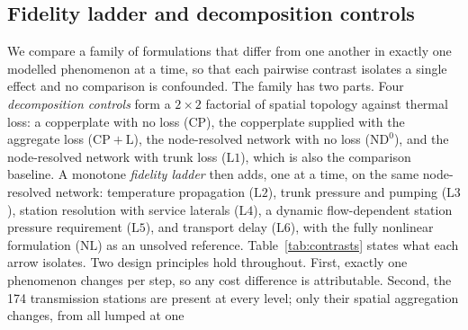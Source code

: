 \documentclass[a4paper,fleqn]{cas-dc}
\newcommand{\CP}{\ensuremath{\mathrm{CP}}}      %
\newcommand{\CPL}{\ensuremath{\mathrm{CP{+}L}}} %
\newcommand{\NDz}{\ensuremath{\mathrm{ND^{0}}}} %
\newcommand{\Lone}{\ensuremath{\mathrm{L1}}}    %
\newcommand{\Ltwo}{\ensuremath{\mathrm{L2}}}    %
\newcommand{\Lthree}{\ensuremath{\mathrm{L3}}}  %
\newcommand{\Lfour}{\ensuremath{\mathrm{L4}}}   %
\newcommand{\Lfive}{\ensuremath{\mathrm{L5}}}   %
\newcommand{\Lsix}{\ensuremath{\mathrm{L6}}}    %
\newcommand{\NLref}{\ensuremath{\mathrm{NL}}}   %
\begin{document}
\subsection{Fidelity ladder and decomposition controls}
We compare a family of formulations that differ from one another in exactly one modelled
phenomenon at a time, so that each pairwise contrast isolates a single effect and no
comparison is confounded. The family has two parts. Four \emph{decomposition controls} form a
$2\times2$ factorial of spatial topology against thermal loss: a copperplate with no loss
($\CP$), the copperplate supplied with the aggregate loss ($\CPL$), the node-resolved network
with no loss ($\NDz$), and the node-resolved network with trunk loss ($\Lone$), which is also
the comparison baseline. A monotone \emph{fidelity ladder} then adds, one at a time, on the
same node-resolved network: temperature propagation ($\Ltwo$), trunk pressure and pumping
($\Lthree$), station resolution with service laterals ($\Lfour$), a dynamic flow-dependent
station pressure requirement ($\Lfive$), and transport delay ($\Lsix$), with the fully
nonlinear formulation ($\NLref$) as an unsolved reference. Table~\ref{tab:contrasts} states
what each arrow isolates. Two design principles hold throughout. First, exactly one phenomenon
changes per step, so any cost difference is attributable. Second, the 174 transmission stations
are present at every level; only their spatial aggregation changes, from all lumped at one
\end{document}
